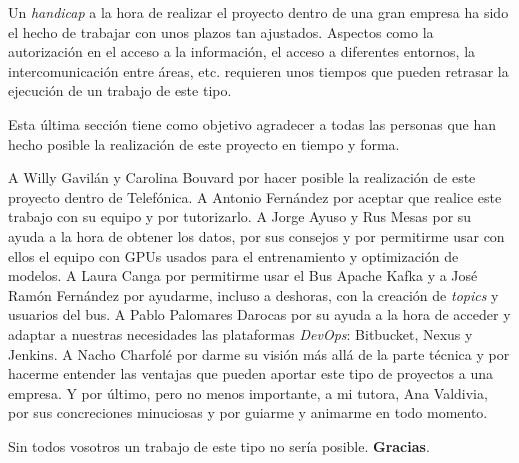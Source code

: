 Un \textit{handicap} a la hora de realizar el proyecto dentro de una gran empresa ha sido el hecho de trabajar con unos plazos tan ajustados. Aspectos como la autorización en el acceso a la información, el acceso a diferentes entornos, la intercomunicación entre áreas, etc. requieren unos tiempos que pueden retrasar la ejecución de un trabajo de este tipo. 
 
Esta última sección tiene como objetivo agradecer a todas las personas que han hecho posible la realización de este proyecto en tiempo y forma.


A Willy Gavilán y Carolina Bouvard por hacer posible la  realización de este proyecto dentro de Telefónica. A Antonio Fernández por aceptar que realice este trabajo con su equipo y por tutorizarlo. A Jorge Ayuso y Rus Mesas por su ayuda a la hora de obtener los datos, por sus consejos y por permitirme usar con ellos el equipo con GPUs usados para  el entrenamiento y optimización de modelos. A Laura Canga por permitirme usar el Bus Apache Kafka y a José Ramón Fernández por ayudarme, incluso a deshoras, con la creación de \textit{topics} y usuarios del bus.  A Pablo Palomares Darocas por su ayuda a la hora de acceder y adaptar a nuestras necesidades las plataformas \textit{DevOps}: Bitbucket, Nexus y Jenkins. A Nacho Charfolé por darme su visión más allá de la parte técnica y por hacerme entender las ventajas que pueden aportar este tipo de proyectos a una empresa. Y por último, pero no menos importante, a mi tutora, Ana Valdivia, por sus concreciones minuciosas y por guiarme y animarme en todo momento.

Sin todos vosotros un trabajo de este tipo no sería posible. \textbf{Gracias}.



 